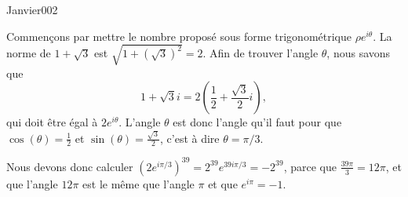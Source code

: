 \begin{corrige}{Janvier002}


Commençons par mettre le nombre proposé sous forme trigonométrique $\rho e^{i\theta}$. La norme de $1+\sqrt{3}$ est $\sqrt{1+(\sqrt{3})^2}=2$. Afin de trouver l'angle $\theta$, nous savons que
\begin{equation}
	1+\sqrt{3}i=2(\frac{ 1 }{2}+\frac{ \sqrt{3} }{ 2 }i),
\end{equation}
qui doit être égal à $2 e^{i\theta}$. L'angle $\theta$ est donc l'angle qu'il faut pour que $\cos(\theta)=\frac{1}{ 2 }$ et $\sin(\theta)=\frac{ \sqrt{3} }{ 2 }$, c'est à dire $\theta=\pi/3$.

Nous devons donc calculer $\left( 2 e^{i\pi/3} \right)^{39}=2^{39} e^{39i\pi/3}=-2^{39}$, parce que $\frac{ 39\pi }{ 3 }=12\pi$, et que l'angle $12\pi$ est le même que l'angle $\pi$ et que $ e^{i\pi}=-1$.

\end{corrige}
